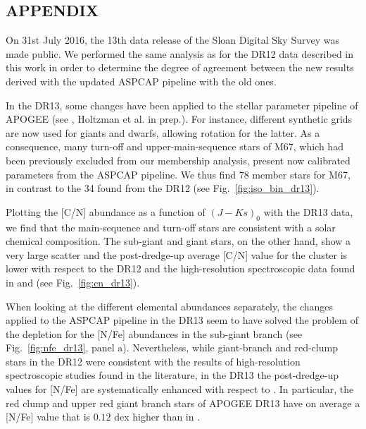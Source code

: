 \documentclass[a4paper,fleqn,usenatbib]{mnras}
\begin{document}
\appendix

\renewcommand\thefigure{A.\arabic{figure}}
\setcounter{figure}{0}
\renewcommand\thetable{A.\arabic{table}}

\newpage
\subsection*{APPENDIX}

On 31st July 2016, the 13th data release of the Sloan Digital Sky Survey was made public. We performed the same analysis as for the DR12 data described in this work in order to determine the  degree of agreement between the new results derived with the updated ASPCAP pipeline with the old ones.

In the DR13, some changes have been applied to the stellar parameter pipeline of APOGEE (see \citealt{sdss2016}, Holtzman et al. in prep.). For instance, different synthetic grids are now used for giants and dwarfs, allowing rotation for the latter. As a consequence, many turn-off and upper-main-sequence stars of M67, which had been previously excluded from our membership analysis, present now calibrated parameters from the ASPCAP pipeline. We thus find 78 member stars for M67, in contrast to the 34 found from the DR12 (see Fig.~\ref{fig:iso_bin_dr13}).

Plotting the [C/N] abundance as a function of $(J-Ks)_0$ with the DR13 data, we find that the main-sequence and turn-off stars are consistent with a solar chemical composition. The sub-giant and giant stars, on the other hand, show a very large scatter and the post-dredge-up average [C/N] value for the cluster is lower with respect to the DR12 and the high-resolution spectroscopic data found in \citet{shetrone2000} and \citet{tautv2000} (see Fig.~\ref{fig:cn_dr13}).

When looking at the different elemental abundances separately, the changes applied to the ASPCAP pipeline in the DR13 seem to have solved the problem of the depletion for the [N/Fe] abundances in the sub-giant branch (see Fig.~\ref{fig:nfe_dr13}, panel a). Nevertheless, while giant-branch and red-clump stars in the DR12 were consistent with the results of high-resolution spectroscopic studies found in the literature, in the DR13 the post-dredge-up values for [N/Fe] are systematically enhanced with respect to \citet{tautv2000}. In particular, the red clump and upper red giant branch stars of APOGEE DR13 have on average a [N/Fe] value that is $0.12$ dex higher than in \citet{tautv2000}. 
\end{document}
